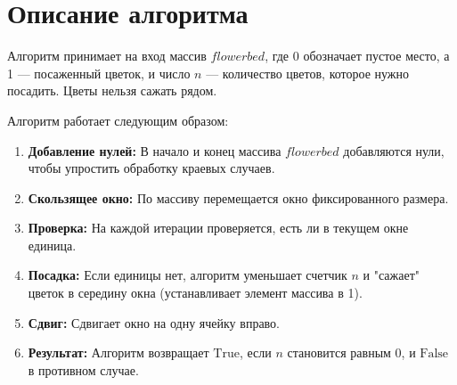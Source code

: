 \documentclass[12pt]{article}
\begin{document}
\section*{Описание алгоритма}

Алгоритм принимает на вход массив \( flowerbed \), где 0 обозначает пустое место, а 1 — посаженный цветок, и число \( n \) — количество цветов, которое нужно посадить. Цветы нельзя сажать рядом.

Алгоритм работает следующим образом:
\begin{enumerate}
	\item \textbf{Добавление нулей:} В начало и конец массива \( flowerbed \) добавляются нули, чтобы упростить обработку краевых случаев.
	\item \textbf{Скользящее окно:} По массиву перемещается окно фиксированного размера.
	\item \textbf{Проверка:} На каждой итерации проверяется, есть ли в текущем окне единица.
	\item \textbf{Посадка:} Если единицы нет, алгоритм уменьшает счетчик \( n \) и "сажает" цветок в середину окна (устанавливает элемент массива в 1).
	\item \textbf{Сдвиг:} Сдвигает окно на одну ячейку вправо.
	\item \textbf{Результат:} Алгоритм возвращает \( \text{True} \), если \( n \) становится равным 0, и \( \text{False} \) в противном случае.
\end{enumerate}
\end{document}
